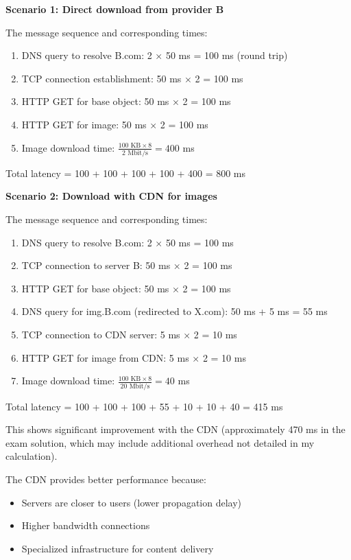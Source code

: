 \documentclass[11pt,a4paper]{article}
\begin{document}
\textbf{Scenario 1: Direct download from provider B}

The message sequence and corresponding times:
\begin{enumerate}
    \item DNS query to resolve B.com: 2 × 50 ms = 100 ms (round trip)
    \item TCP connection establishment: 50 ms × 2 = 100 ms
    \item HTTP GET for base object: 50 ms × 2 = 100 ms
    \item HTTP GET for image: 50 ms × 2 = 100 ms
    \item Image download time: $\frac{100 \text{ KB} \times 8}{2 \text{ Mbit/s}} = 400$ ms
\end{enumerate}

Total latency = 100 + 100 + 100 + 100 + 400 = 800 ms

\textbf{Scenario 2: Download with CDN for images}

The message sequence and corresponding times:
\begin{enumerate}
    \item DNS query to resolve B.com: 2 × 50 ms = 100 ms
    \item TCP connection to server B: 50 ms × 2 = 100 ms
    \item HTTP GET for base object: 50 ms × 2 = 100 ms
    \item DNS query for img.B.com (redirected to X.com): 50 ms + 5 ms = 55 ms
    \item TCP connection to CDN server: 5 ms × 2 = 10 ms
    \item HTTP GET for image from CDN: 5 ms × 2 = 10 ms
    \item Image download time: $\frac{100 \text{ KB} \times 8}{20 \text{ Mbit/s}} = 40$ ms
\end{enumerate}

Total latency = 100 + 100 + 100 + 55 + 10 + 10 + 40 = 415 ms

This shows significant improvement with the CDN (approximately 470 ms in the exam solution, which may include additional overhead not detailed in my calculation).

The CDN provides better performance because:
\begin{itemize}
    \item Servers are closer to users (lower propagation delay)
    \item Higher bandwidth connections
    \item Specialized infrastructure for content delivery
\end{itemize}
\end{document}
